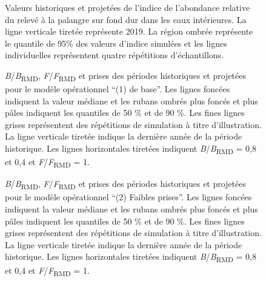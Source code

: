 \documentclass[french,11pt]{book}
\begin{document}
\clearpage
\begin{figure}[htb]

{\centering {} 

}

\caption{Valeurs historiques et projetées de l’indice de l’abondance relative du relevé à la palangre sur fond dur dans les eaux intérieures. La ligne verticale tiretée représente 2019. La région ombrée représente le quantile de 95\% des valeurs d’indice simulées et les lignes individuelles représentent quatre répétitions d’échantillons.}\label{fig:proj-index}
\end{figure}
\clearpage


\begin{figure}[htb]

{\centering {} 

}

\caption{\emph{B}/\emph{B}\textsubscript{RMD}, \emph{F}/\emph{F}\textsubscript{RMD} et prises des périodes historiques et projetées pour le modèle opérationnel ``(1) de base''. Les lignes foncées indiquent la valeur médiane et les rubans ombrés plus foncés et plus pâles indiquent les quantiles de 50 \% et de 90 \%. Les fines lignes grises représentent des répétitions de simulation à titre d'illustration. La ligne verticale tiretée indique la dernière année de la période historique. Les lignes horizontales tiretées indiquent \emph{B}/\emph{B}\textsubscript{RMD} = 0,8 et 0,4 et \emph{F}/\emph{F}\textsubscript{RMD} = 1.}\label{fig:proj-updog-fixsel}
\end{figure}

\begin{figure}[htb]

{\centering {} 

}

\caption{\emph{B}/\emph{B}\textsubscript{RMD}, \emph{F}/\emph{F}\textsubscript{RMD} et prises des périodes historiques et projetées pour le modèle opérationnel ``(2) Faibles prises''. Les lignes foncées indiquent la valeur médiane et les rubans ombrés plus foncés et plus pâles indiquent les quantiles de 50 \% et de 90 \%. Les fines lignes grises représentent des répétitions de simulation à titre d'illustration. La ligne verticale tiretée indique la dernière année de la période historique. Les lignes horizontales tiretées indiquent \emph{B}/\emph{B}\textsubscript{RMD} = 0,8 et 0,4 et \emph{F}/\emph{F}\textsubscript{RMD} = 1.}\label{fig:proj-low-catch}
\end{figure}
\end{document}
